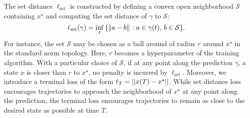 %
    The set distance $\ell_{\textrm{set}}$ is constructed by defining a convex open
    neighborhood $\mathcal{S}$ containing $x^\star$ and computing the set distance of
    $\gamma$ to $\mathcal{S}$:
    \begin{equation}
        \ell_{\textrm{set}}(\gamma)
        = \underset{t}{\inf} \, {\{ \|{a - b}\|_{{}_{}}: a \in \gamma(t),\, b \in \mathcal{S} \}}.  
        \label{eq:set_distance}
    \end{equation}
    For instance, the set $\mathcal{S}$ may be chosen as a ball around of radius
    $r$ around $x^\star$ in the standard norm topology. 
    Here, $r$ becomes a hyperparameter of the training algorithm. With a
    particular choice of $\mathcal{S}$, if at any point along the prediction
    $\gamma$, a state $x$ is closer than $r$ to $x^\star$, no penalty is
    incurred by $\ell_{\textrm{set}}$. 
    Moreover, we introduce a terminal loss of the form $\ell_T= \left|\left|x(T)
    - x^\star\right|\right|$. 
    While set distance loss encourages trajectories to approach the neighborhood
    of $x^\star$ at any point along the prediction, the terminal loss encourages
    trajectories to remain as close to the desired state as possible at
    time $T$.

